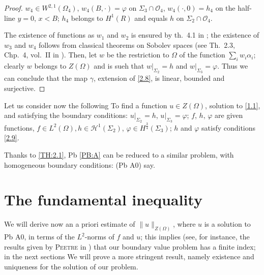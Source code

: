 \documentclass[a4paper,12pt,leqno]{article}
\numberwithin{equation}{section}
\newenvironment{problem}[1]
{\renewcommand\theinnerproblem{#1}\innerproblem}
{\endinnerproblem}
\begin{document}
\begin{proof}
$w_{4} \in W^{2,1}\left(\Omega_{4}\right)$, $w_{4}(B, \cdot)=\varphi$ on $\Sigma_{3} \cap \mathcal{O}_{4}$, $w_{4}(\cdot, 0)=h_{4}$ on the half-line $y=0$, $x<B$;
$h_4$ belongs to $H^{1}(R)$ and equals $h$ on $\Sigma_{2} \cap \mathcal{O}_{4}$.

The existence of functions as $w_{1}$ and $w_{2}$ is ensured by th.\ 4.1 in \cite{zbMATH03479447}; the existence of $w_{3}$ and $w_{4}$ follows from classical theorems on Sobolev spaces (see Th.\ 2.3, Chp.\ 4, vol.\ II in \cite{zbMATH03353865}). Then, let $w$ be the restriction to $\Omega$ of the function $\sum_{i} w_{i} \alpha_{i}$; clearly $w$ belongs to $Z(\Omega)$ and is sueh that $\left.w\right|_{\Sigma_{2}}=h$ and $\left.w\right|_{\Sigma_{3}}=\varphi$. Thus we can conclude that the map $\gamma$, extension of \eqref{2.8}, is linear, bounded and surjective.
\end{proof}

Let us consider now the following
\begin{problem}{A} \label{PB:A}
	To find a function $u \in Z(\Omega)$, solution to \cref{1.1}, and satisfying the boundary conditions: $\left.u\right|_{\Sigma_{2}}=h$, $\left.u\right|_{\Sigma_{3}}=\varphi$; $f$, $h$, $\varphi$ are given functions, $f \in L^{2}(\Omega), h \in \mathscr{H}^1\left(\Sigma_{2}\right)$, $\varphi \in H^{\frac{3}{4}}\left(\Sigma_{3}\right)$; $h$ and $\varphi$ satisfy conditions \eqref{2.9}.
\end{problem}

Thanks to \cref{TH:2.1}, Pb \ref{PB:A} can be reduced to a similar problem, with homogeneous boundary conditions: (Pb A0) say.

\section{The fundamental inequality} \label{S3}

We will derive now an a priori estimate of $\|u\|_{Z(\Omega)}$, where $u$ is a solution to Pb A0, in terms of the $L^{2}$-norms of $f$ and $u$; this implies (see, for instance, the results given by \textsc{Peetre} in \cite{zbMATH03169679}) that our boundary value problem has a finite index; in the next sections We will prove a more stringent result, namely existence and uniqueness for the solution of our problem.
\end{document}
